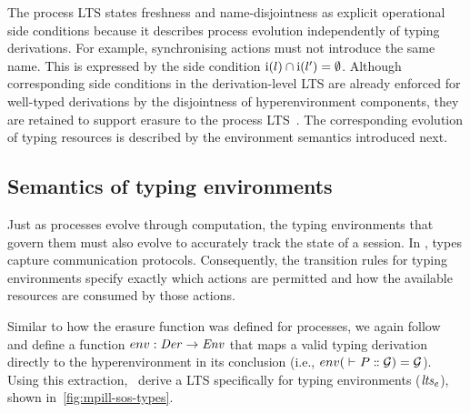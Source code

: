 The process LTS states freshness and name-disjointness as explicit operational side conditions because it describes process evolution independently of typing derivations. For example, synchronising actions must not introduce the same name. This is expressed by the side condition $\operatorname{i}(l) \cap \operatorname{i}(l') = \emptyset$. Although corresponding side conditions in the derivation-level LTS are already enforced for well-typed derivations by the disjointness of hyperenvironment components, they are retained to support erasure to the process LTS~\citep[Remark~3.6]{abs-2106-11818}. The corresponding evolution of typing resources is described by the environment semantics introduced next.

\subsection{Semantics of typing environments}\label{subsec:semantics-environments}
Just as processes evolve through computation, the typing environments that govern them must also evolve to accurately track the state of a session. In \pill, types capture communication protocols. Consequently, the transition rules for typing environments specify exactly which actions are permitted and how the available resources are consumed by those actions. 

Similar to how the erasure function was defined for processes, we again follow~\citet{abs-2106-11818} and define a function $env : \mathit{Der} \to \mathit{Env}$ that maps a valid typing derivation directly to the hyperenvironment in its conclusion (i.e., {$env({{} \vdash_{} P \mathrel{:\mspace{-1mu}:} \mathcal{G}}) = \mathcal{G}$}). Using this extraction,~\citet{abs-2106-11818} derive a LTS specifically for typing environments ($\mathit{lts_{e}}$), shown in~\cref{fig:mpill-sos-types}.

